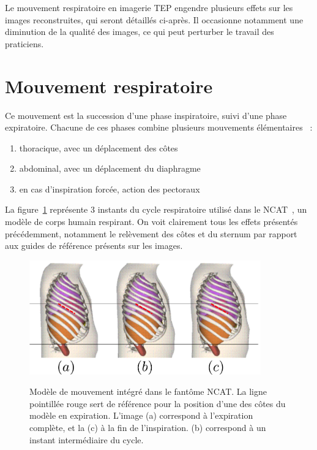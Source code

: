 Le mouvement respiratoire en imagerie TEP engendre plusieurs effets sur les images reconstruites, qui seront détaillés ci-après. Il occasionne notamment une diminution de la qualité des images, ce qui peut perturber le travail des praticiens.

\section{Mouvement respiratoire}

Ce mouvement est la succession d'une phase inspiratoire, suivi d'une phase expiratoire. Chacune de ces phases combine plusieurs mouvements élémentaires~\cite{servant2007cours} :
 
\begin{enumerate}
 \item thoracique, avec un déplacement des côtes
 \item abdominal, avec un déplacement du diaphragme
 \item en cas d'inspiration forcée, action des pectoraux
\end{enumerate}

La figure~\ref{fig:respiXCAT} représente 3 instants du cycle respiratoire utilisé dans le NCAT~\cite{segars2001These}, un modèle de corps humain respirant. On voit clairement tous les effets présentés précédemment, notamment le relèvement des côtes et du sternum par rapport aux guides de référence  présents sur les images.

\begin{figure}[h!]
    \begin{center}
            \includegraphics[width=10cm]{images/mvtRespi} \\
    \end{center}
    \caption[Modèle de mouvement intégré dans le fantôme NCAT]{Modèle de mouvement intégré dans le fantôme NCAT. La ligne pointillée rouge sert de référence pour la position d'une des côtes du modèle en expiration. L'image (a) correspond à l'expiration complète, et la (c) à la fin de l'inspiration. (b) correspond à un instant intermédiaire du cycle. }
    \label{fig:respiXCAT}
\end{figure}


